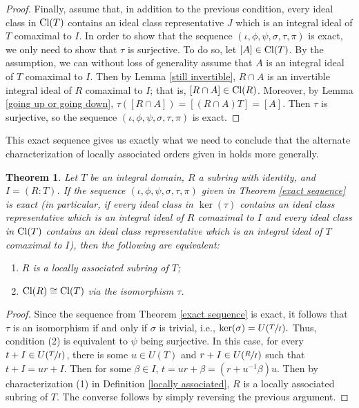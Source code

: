 \documentclass[12pt]{amsart}
\newtheorem{theorem}{Theorem}[section]
\theoremstyle{definition}
\newcommand{\Cl}{\textup{Cl}}
\begin{document}
\begin{proof}
    Finally, assume that, in addition to the previous condition, every ideal class in $\Cl(T)$ contains an ideal class representative $J$ which is an integral ideal of $T$ comaximal to $I$. In order to show that the sequence $(\iota,\phi,\psi,\sigma,\tau,\pi)$ is exact, we only need to show that $\tau$ is surjective. To do so, let $[A]\in\Cl(T)$. By the assumption, we can without loss of generality assume that $A$ is an integral ideal of $T$ comaximal to $I$. Then by Lemma \ref{still invertible}, $R\cap A$ is an invertible integral ideal of $R$ comaximal to $I$; that is, $[R\cap A]\in \Cl(R)$. Moreover, by Lemma \ref{going up or going down}, $\tau([R\cap A])=[(R\cap A)T]=[A]$. Then $\tau$ is surjective, so the sequence $(\iota,\phi,\psi,\sigma,\tau,\pi)$ is exact.
\end{proof}

This exact sequence gives us exactly what we need to conclude that the alternate characterization of locally associated orders given in \cite[Theorem 3.4]{subringrelations} holds more generally.

\begin{theorem}
    Let $T$ be an integral domain, $R$ a subring with identity, and $I=(R:T)$. If the sequence $(\iota,\phi,\psi,\sigma,\tau,\pi)$ given in Theorem \ref{exact sequence} is exact (in particular, if every ideal class in $\ker(\tau)$ contains an ideal class representative which is an integral ideal of $R$ comaximal to $I$ and every ideal class in $\Cl(T)$ contains an ideal class representative which is an integral ideal of $T$ comaximal to $I$), then the following are equivalent:
    \begin{enumerate}
        \item $R$ is a locally associated subring of $T$;
        \item $\Cl(R)\cong \Cl(T)$ via the isomorphism $\tau$.
    \end{enumerate}
\end{theorem}

\begin{proof}
    Since the sequence from Theorem \ref{exact sequence} is exact, it follows that $\tau$ is an isomorphism if and only if $\sigma$ is trivial, i.e., $\ker(\sigma)=U(\sfrac{T}{I}).$ Thus, condition (2) is equivalent to $\psi$ being surjective. In this case, for every $t+I\in U(\sfrac{T}{I})$, there is some $u\in U(T)$ and $r+I\in U(\sfrac{R}{I})$ such that $t+I=ur+I$. Then for some $\beta\in I$, $t=ur+\beta=(r+u^{-1}\beta)u.$ Then by characterization (1) in Definition \ref{locally associated}, $R$ is a locally associated subring of $T$. The converse follows by simply reversing the previous argument.
\end{proof}
\end{document}

